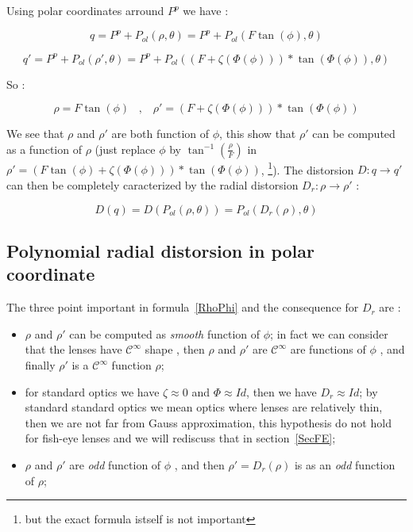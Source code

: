 Using polar coordinates arround $P^p$ we have :

\begin{equation}
	q = P^p + P_{ol}(\rho,\theta) =  P^p+  P_{ol} ( F \tan(\phi), \theta) \label{PolInit} 
\end{equation}

\begin{equation}
	q' = P^p+   P_{ol}(\rho',\theta) =  P^p+  P_{ol}( (F+\zeta(\Phi(\phi))) * \tan(\Phi(\phi)), \theta) \label{PolDist}
\end{equation}

So : 

\begin{equation}
       \rho = F \tan(\phi)   \;\;\; , \;\;\;  \rho' = (F+\zeta(\Phi(\phi))) * \tan(\Phi(\phi))   \label{RhoPhi}
\end{equation}

We see that $\rho$ and $\rho'$ are both function of $\phi$, this show that $\rho'$ can be
computed as a function of $\rho$ (just replace $\phi$ by $\tan^{-1}(\frac{\rho}{F})$ in  $\rho'= (F \tan(\phi) +\zeta(\Phi(\phi))) * \tan(\Phi(\phi))$,
\footnote{but the exact formula istself is not important}).
The distorsion $D : q \rightarrow q' $ can then be completely caracterized by the radial distorsion
$D_r : \rho \rightarrow  \rho'$ :

\begin{equation}
	D(q)  =   D(P_{ol}(\rho,\theta))  =   P_{ol}(D_r(\rho),\theta)
\end{equation}


\subsection{Polynomial radial distorsion in polar coordinate}

The three point important in formula~\ref{RhoPhi} and the consequence for $D_r$  are :

\begin{itemize}
   \item $\rho$ and $\rho'$ can be computed as \emph{smooth} function of $\phi$; in fact we can 
         consider that the lenses have $\mathcal{C}^{\infty}$ shape ,  then   $\rho$ and $\rho'$ 
         are $\mathcal{C}^{\infty}$ are functions of $\phi$ , and finally $\rho'$ is a 
         $\mathcal{C}^{\infty}$ function $\rho$;

   \item for standard optics we have  $\zeta \approx 0$ and $\Phi \approx Id$,  then we have $D_r \approx Id$;
         by standard standard optics we mean optics where lenses are relatively thin, then  we are not far from Gauss approximation,
         this hypothesis do not hold for fish-eye lenses and we will rediscuss that in section~\ref{SecFE};

   \item $\rho$ and $\rho'$ are  \emph{odd}  function of $\phi$ , and then $\rho'=D_r(\rho)$ is as an \emph{odd}  function of 
        $\rho$;

\end{itemize}

